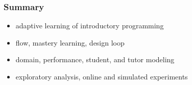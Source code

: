 \documentclass[bigger]{beamer}
\begin{document}
\begin{frame}
  \frametitle{Summary}
  \begin{itemize}
  \item adaptive learning of introductory programming

  \item flow, mastery learning, design loop

  \item domain, performance, student, and tutor modeling

  \item exploratory analysis, online and simulated experiments
  \end{itemize}
\end{frame}
\end{document}
